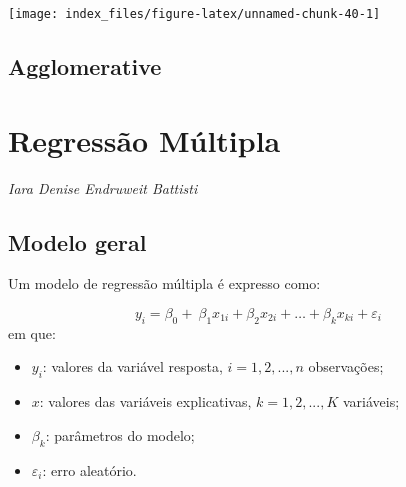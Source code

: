 \documentclass[12pt,brazil,oneside]{book}
\newenvironment{Shaded}{\begin{snugshade}}{\end{snugshade}}
\newcommand{\CommentTok}[1]{\textcolor[rgb]{0.56,0.35,0.01}{\textit{#1}}}
\newcommand{\DataTypeTok}[1]{\textcolor[rgb]{0.13,0.29,0.53}{#1}}
\newcommand{\KeywordTok}[1]{\textcolor[rgb]{0.13,0.29,0.53}{\textbf{#1}}}
\newcommand{\NormalTok}[1]{#1}
\newcommand{\OtherTok}[1]{\textcolor[rgb]{0.56,0.35,0.01}{#1}}
\newcommand{\StringTok}[1]{\textcolor[rgb]{0.31,0.60,0.02}{#1}}
\begin{document}
\begin{Shaded}
\end{Shaded}

\begin{center}\texttt{[image: index\_files/figure-latex/unnamed-chunk-40-1]} \end{center}

\hypertarget{agglomerative}{%
\section{Agglomerative}\label{agglomerative}}

\hypertarget{regressao-multipla}{%
\chapter{Regressão Múltipla}\label{regressao-multipla}}

\emph{Iara Denise Endruweit Battisti}

\hypertarget{modelo-geral}{%
\section{Modelo geral}\label{modelo-geral}}

Um modelo de regressão múltipla é expresso como:

\[ 
y_{i} = \beta_0+\ \beta_1x_{1i}+\beta_2x_{2i}+\dots+\beta_kx_{ki}+\varepsilon_i\ 
\]
\noindent
em que:

\begin{itemize}
\item
  \(y_{i}\): valores da variável resposta, \(i = 1, 2,..., n\) observações;
\item
  \(x\): valores das variáveis explicativas, \(k = 1, 2,..., K\) variáveis;
\item
  \(\beta_k\): parâmetros do modelo;
\item
  \(\varepsilon_i\): erro aleatório.
\end{itemize}
\end{document}
